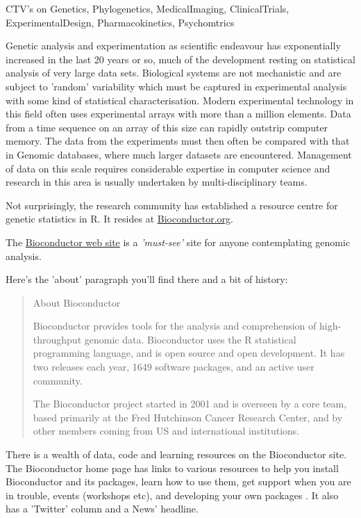 \documentclass[titlepage]{book}\usepackage{knitr}
\begin{document}
 CTV's on Genetics, Phylogenetics,  MedicalImaging, ClinicalTrials, ExperimentalDesign, Pharmacokinetics, Psychomtrics
 
 Genetic analysis and experimentation as scientific endeavour has exponentially increased in the last 20 years or so, much of the development resting on statistical analysis of very large data sets.  Biological systems are not mechanistic and are subject to 'random' variability which must be captured in experimental analysis with some kind of statistical characterisation. Modern experimental technology in this field often uses experimental arrays with more than a million elements. Data from a time sequence on an array of this size can rapidly outstrip computer memory.  The data from the experiments must then often be compared with that in Genomic databases, where much larger datasets are encountered.  Management of data on this scale requires considerable expertise in computer science and research in this area is usually undertaken by multi-disciplinary teams. 

Not surprisingly, the research community has established a resource centre for genetic statistics in R.  It resides at \href{http://www.Bioconductor.org/}{Bioconductor.org}. 

The \href{http://www.bioconductor.org/}{Bioconductor web site} is a \emph{'must-see'} site for anyone contemplating genomic analysis.

Here's the 'about' paragraph you'll find there and a bit of history:
\begin{quote}

{\Large About Bioconductor}

Bioconductor provides tools for the analysis and comprehension of high-throughput genomic data. Bioconductor uses the R statistical programming language, and is open source and open development. It has two releases each year, 1649 software packages, and an active user community.

The Bioconductor project started in 2001 and is overseen by a core team, based primarily at the Fred Hutchinson Cancer Research Center, and by other members coming from US and international institutions.

\end{quote}

There is a wealth of data, code and learning resources on the Bioconductor site. The Bioconductor home page has links to various resources to help you install Bioconductor and its packages, learn how to use them, get support when you are in trouble, events (workshops etc), and  developing your own packages . It also has a 'Twitter' column and a News' headline. 
 
\end{document}
